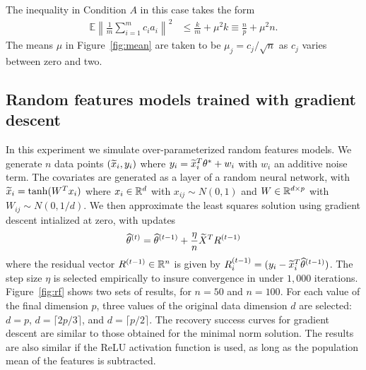 The inequality in Condition $A$  in this case takes the form
\begin{align*}
  \mathbb{E}\left\|\frac{1}{m}\sum_{i=1}^m c_i a_i\right\|^2 &\leq \frac{k}{m} + \mu^2 k
   \equiv \frac{n}{p} + \mu^2 n.
\end{align*}
The means $\mu$ in Figure~\ref{fig:mean} are taken to be $\mu_j = c_j / \sqrt{n}$ as $c_j$ varies between zero and two.

\subsection{Random features models trained with gradient descent}

In this experiment we simulate over-parameterized random features models.
We generate $n$ data points $(\widetilde{x}_i, y_i)$ where
$y_i = \widetilde{x}_i^T \theta^* + w_i$ with $w_i$ an additive noise term. The covariates are generated
as a layer of a random neural network, with $\widetilde{x}_i = \tanh(W^Tx_i)$ where $x_i \in\mathbb{R}^d$ with $x_{ij} \sim N(0,1)$
and $W\in\mathbb{R}^{d\times p}$ with $W_{ij} \sim N(0, 1/d)$. We then approximate the least squares
solution using gradient descent intialized at zero, with updates
\begin{equation}
  \hat\theta^{(t)} = \hat\theta^{(t-1)} + \frac{\eta}{n} \wt{X}^T R^{(t-1)}
\end{equation}
where the residual vector $R^{(t-1)}\in\mathbb{R}^n$ is given by $R_i^{(t-1)} = (y_i - \widetilde{x}_i^ T\widehat\theta^{(t-1)})$.
The step size $\eta$ is selected empirically to insure convergence in under $1{,}000$ iterations.
Figure~\ref{fig:rf} shows two sets of results, for $n=50$ and $n=100$. For each value of the final dimension $p$,
three values of the original data dimension $d$ are selected: $d=p$, $d=\lceil 2p/3\rceil$,
and $d=\lceil p/2\rceil$. The recovery success curves for gradient descent are similar to those obtained for the minimal norm solution. The results are also similar if the ReLU activation function is used, as long as the population mean of the features is subtracted.

